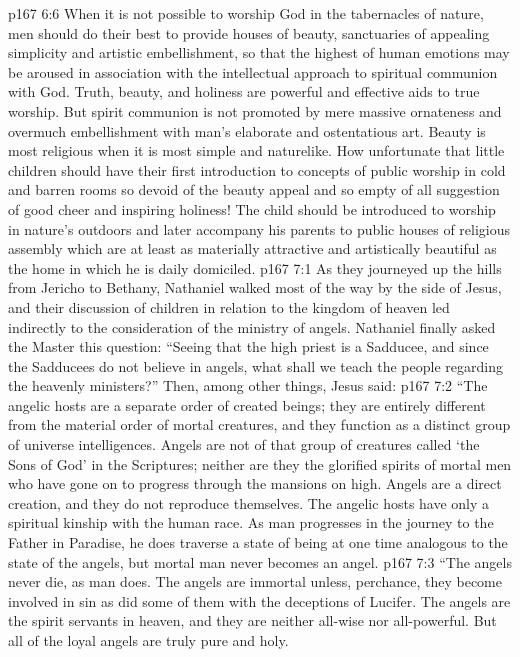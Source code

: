 \vs p167 6:6 When it is not possible to worship God in the tabernacles of nature, men should do their best to provide houses of beauty, sanctuaries of appealing simplicity and artistic embellishment, so that the highest of human emotions may be aroused in association with the intellectual approach to spiritual communion with God. Truth, beauty, and holiness are powerful and effective aids to true worship. But spirit communion is not promoted by mere massive ornateness and overmuch embellishment with man’s elaborate and ostentatious art. Beauty is most religious when it is most simple and naturelike. How unfortunate that little children should have their first introduction to concepts of public worship in cold and barren rooms so devoid of the beauty appeal and so empty of all suggestion of good cheer and inspiring holiness! The child should be introduced to worship in nature’s outdoors and later accompany his parents to public houses of religious assembly which are at least as materially attractive and artistically beautiful as the home in which he is daily domiciled.\plusone
{}
\vs p167 7:1 As they journeyed up the hills from Jericho to Bethany, Nathaniel walked most of the way by the side of Jesus, and their discussion of children in relation to the kingdom of heaven led indirectly to the consideration of the ministry of angels. Nathaniel finally asked the Master this question: “Seeing that the high priest is a Sadducee, and since the Sadducees do not believe in angels, what shall we teach the people regarding the heavenly ministers?” Then, among other things, Jesus said:
\pc \vs p167 7:2 \textcolor{ubdarkred}{“The angelic hosts are a separate order of created beings; they are entirely different from the material order of mortal creatures, and they function as a distinct group of universe intelligences. Angels are not of that group of creatures called ‘the Sons of God’ in the Scriptures; neither are they the glorified spirits of mortal men who have gone on to progress through the mansions on high. Angels are a direct creation, and they do not reproduce themselves. The angelic hosts have only a spiritual kinship with the human race. As man progresses in the journey to the Father in Paradise, he does traverse a state of being at one time analogous to the state of the angels, but mortal man never becomes an angel.}
\vs p167 7:3 \textcolor{ubdarkred}{“The angels never die, as man does. The angels are immortal unless, perchance, they become involved in sin as did some of them with the deceptions of Lucifer. The angels are the spirit servants in heaven, and they are neither all\hyp{}wise nor all\hyp{}powerful. But all of the loyal angels are truly pure and holy.}
